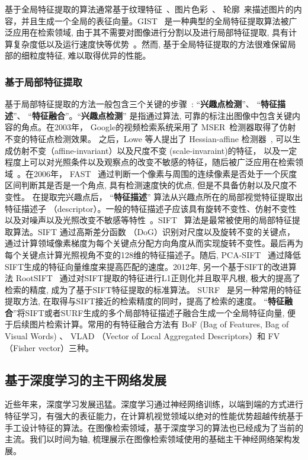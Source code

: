 基于全局特征提取的算法通常基于纹理特征~\cite{park2002fast,wang2014content}、图片色彩~\cite{wang2011interactive}\cite{wengert2011bag}、 轮廓~\cite{wang2006large}来描述图片的内容，并且生成一个全局的表征向量。GIST~\cite{friedman1979framing,torralba2003context} 是一种典型的全局特征提取算法被广泛应用在检索领域, 由于其不需要对图像进行分割以及进行局部特征提取, 具有计算复杂度低以及运行速度快等优势~\cite{zhou2017recent}。然而, 基于全局特征提取的方法很难保留局部的细粒度特征, 难以取得优异的性能。
\subsubsection{基于局部特征提取}
基于局部特征提取的方法一般包含三个关键的步骤~\cite{zhou2017recent}: ``\textbf{兴趣点检测}''、 ``\textbf{特征描述}''、 ``\textbf{特征融合}''。``\textbf{兴趣点检测}'' 是指通过算法, 可靠的标注出图像中包含关键内容的角点。在2003年， Google的视频检索系统采用了 MSER~\cite{matas2004robust}检测器取得了仿射不变的特征点检测效果。 之后，Lowe 等人提出了 Hessian-affine 检测器~\cite{lowe2004distinctive}, 可以生成仿射不变（affine-invariant）以及尺度不变 (scale-invaraint)的特征， 以及一定程度上可以对光照条件以及观察点的改变不敏感的特征，随后被广泛应用在检索领域~\cite{philbin2007object}。在2006年， FAST~\cite{rosten2008faster} 通过判断一个像素与周围的连续像素是否处于一个灰度区间判断其是否是一个角点, 具有检测速度快的优点, 但是不具备仿射以及尺度不变性。 在提取完兴趣点后， ``\textbf{特征描述}'' 算法从兴趣点所在的局部视觉特征提取出特征描述子 （descriptor）。一般的特征描述子应该具有旋转不变性、仿射不变性以及对噪声以及光照改变不敏感等特性~\cite{zhou2017recent}。SIFT ~\cite{lowe2004distinctive}算法是最常被使用的局部特征提取算法。SIFT 通过高斯差分函数 （DoG）识别对尺度以及旋转不变的关键点，通过计算领域像素梯度为每个关键点分配方向角度从而实现旋转不变性。最后再为每个关键点计算光照视角不变的128维的特征描述子。随后, PCA-SIFT~\cite{ke2004pca} 通过降低SIFT生成的特征向量维度来提高匹配的速度。2012年, 另一个基于SIFT的改进算法 RootSIFT~\cite{arandjelovic2012three} 通过对SIFT提取的特征进行L1正则化并且取平凡根, 极大的提高了检索的精度, 成为了基于SIFT特征提取的标准算法。 SURF~\cite{bay2006surf} 是另一种常用的特征提取方法, 在取得与SIFT接近的检索精度的同时，提高了检索的速度。 ``\textbf{特征融合}''将SIFT或者SURF生成的多个局部特征描述子融合生成一个全局特征向量, 便于后续图片检索计算。常用的有特征融合方法有 BoF (Bag of Features, Bag of Visual Words) 、 VLAD （Vector of Local Aggregated Descriptors）和 FV （Fisher vector）三种。
\subsection{基于深度学习的主干网络发展}
近些年来，深度学习发展迅猛。深度学习通过神经网络训练，以端到端的方式进行特征学习，有强大的表征能力，在计算机视觉领域以绝对的性能优势超越传统基于手工设计特征的算法。在图像检索领域，基于深度学习的算法也已经成为了当前的主流。我们以时间为轴, 梳理展示在图像检索领域使用的基础主干神经网络架构发展。
